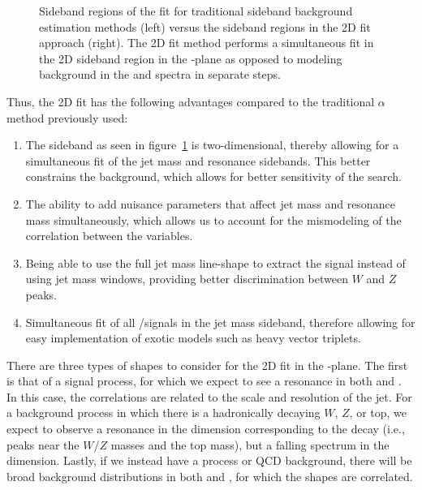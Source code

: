 \begin{figure}[htbp]
  \centering
  
  \caption{
    Sideband regions of the fit for traditional sideband background estimation methods (left) versus the sideband regions in the 2D fit approach (right).
    The 2D fit method performs a simultaneous fit in the 2D sideband region in the \MVV-\MJ plane as opposed to modeling background in the \MVV and \MJ spectra in separate steps.
  }
  \label{fig:2Dfit}
\end{figure}

Thus, the 2D fit has the following advantages compared to the traditional $\alpha$ method previously used:
\begin{enumerate}
  \item The sideband as seen in figure~\ref{fig:2Dfit} is two-dimensional, thereby allowing for a simultaneous fit of the jet mass and resonance sidebands.
  This better constrains the background, which allows for better sensitivity of the search.
  \item The ability to add nuisance parameters that affect jet mass and resonance mass simultaneously, which allows us to account for the mismodeling of the correlation between the variables.
  \item Being able to use the full jet mass line-shape to extract the signal instead of using jet mass windows, providing better discrimination between $W$ and $Z$ peaks.
  \item Simultaneous fit of all \WV/\WH signals in the jet mass sideband, therefore allowing for easy implementation of exotic models such as heavy vector triplets.
\end{enumerate}

There are three types of shapes to consider for the 2D fit in the \MVV-\MJ plane.
The first is that of a signal process, for which we expect to see a resonance in both \MVV and \MJ.
In this case, the correlations are related to the scale and resolution of the jet.
For a background process in which there is a hadronically decaying $W$, $Z$, or top, we expect to observe a resonance in the \MJ dimension corresponding to the decay (i.e., peaks near the $W$/$Z$ masses and the top mass), but a falling spectrum in the \MVV dimension.
Lastly, if we instead have a \Wjets process or QCD background, there will be broad background distributions in both \MVV and \MJ, for which the shapes are correlated.

